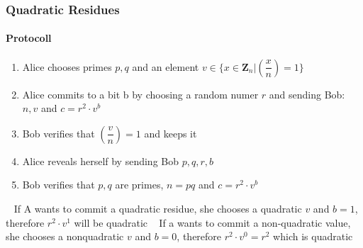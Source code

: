 \begin{frame}
	\frametitle{Quadratic Residues}
	\framesubtitle{Protocoll}
	\begin{Large}
		\begin{enumerate}
			\item Alice chooses primes $p,q$ and an element $v \in \{ x \in \mathbf{Z}_n | (\dfrac{x}{n}) = 1\}$ 
			\item Alice commits to a bit b by choosing a random numer $r$ and sending Bob: $n,v$ and $c = r^2\cdot v^b$
			\item Bob verifies that $(\dfrac{v}{n})=1$ and keeps it
			\item Alice reveals herself by sending Bob $p,q,r,b$
			\item Bob verifies that $p,q$ are primes, $n=pq$ and $c=r^2\cdot v^b$ 
		\end{enumerate}
	\end{Large}
~\newline
If A wants to commit a quadratic residue, she chooses a quadratic $v$ and $b=1$, therefore $r^2 \cdot v^1$ will be quadratic ~\newline
If a wants to commit a non-quadratic value, she chooses a nonquadratic $v$ and $b=0$, therefore $r^2 \cdot v^0 = r^2$ which is quadratic
\end{frame}